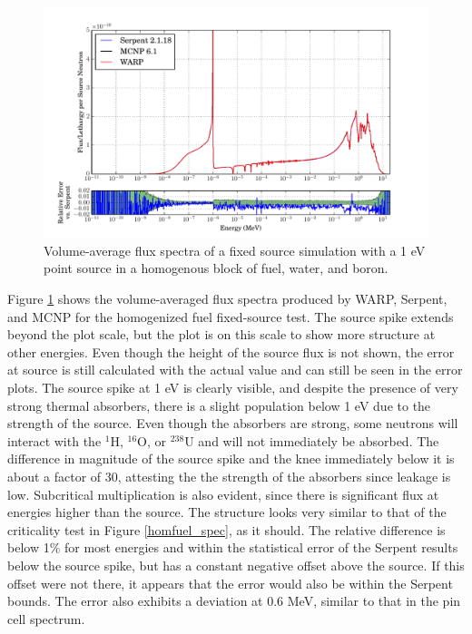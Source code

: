 \begin{figure}[h!]
\centering
\includegraphics[width=\textwidth,trim= 1cm 0cm 1cm 0cm]{graphics/finalresults/fixed_spec_homfuel.pdf}
\caption{Volume-average flux spectra of a fixed source simulation with a 1 eV point source in a homogenous block of fuel, water, and boron. \label{fixed_spec_homfuel} }
\end{figure}

Figure \ref{fixed_spec_homfuel} shows the volume-averaged flux spectra produced by WARP, Serpent, and MCNP for the homogenized fuel fixed-source test.  The source spike extends beyond the plot scale, but the plot is on this scale to show more structure at other energies.  Even though the height of the source flux is not shown, the error at source is still calculated with the actual value and can still be seen in the error plots.  The source spike at 1 eV is clearly visible, and despite the presence of very strong thermal absorbers, there is a slight population below 1 eV due to the strength of the source.  Even though the absorbers are strong, some neutrons will interact with the $^{1}$H, $^{16}$O, or $^{238}$U and will not immediately be absorbed.  The difference in magnitude of the source spike and the knee immediately below it is about a factor of 30, attesting the the strength of the absorbers since leakage is low.  Subcritical multiplication is also evident, since there is significant flux at energies higher than the source.  The structure looks very similar to that of the criticality test in Figure \ref{homfuel_spec}, as it should.  The relative difference is below 1\% for most energies and within the statistical error of the Serpent results below the source spike, but has a constant negative offset above the source.  If this offset were not there, it appears that the error would also be within the Serpent bounds.  The error also exhibits a deviation at 0.6 MeV, similar to that in the pin cell spectrum.   %

